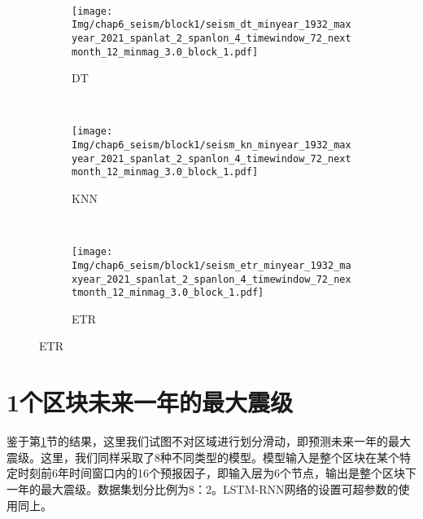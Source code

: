 \begin{figure}[!htbp]
\begin{subfigure}[b]{0.45\textwidth}
    \vspace{-1cm}
    \label{fig:seism_gbr_minyear_1932_maxyear_2021_spanlat_2_spanlon_4_timewindow_72_nextmonth_12_minmag_3.0_block_1}
  \end{subfigure}
  ~
  \begin{subfigure}[b]{0.45\textwidth}
    \caption{DT}
    \vspace{-0.2cm}
    \texttt{[image: Img/chap6\_seism/block1/seism\_dt\_minyear\_1932\_maxyear\_2021\_spanlat\_2\_spanlon\_4\_timewindow\_72\_nextmonth\_12\_minmag\_3.0\_block\_1.pdf]}
    \vspace{-1cm}
    \label{fig:seism_dt_minyear_1932_maxyear_2021_spanlat_2_spanlon_4_timewindow_72_nextmonth_12_minmag_3.0_block_1}
  \end{subfigure}
  \\
  \begin{subfigure}[b]{0.45\textwidth}
    \caption{KNN}
    \vspace{-0.2cm}
    \texttt{[image: Img/chap6\_seism/block1/seism\_kn\_minyear\_1932\_maxyear\_2021\_spanlat\_2\_spanlon\_4\_timewindow\_72\_nextmonth\_12\_minmag\_3.0\_block\_1.pdf]}
    \vspace{-1cm}
    \label{fig:seism_knn_minyear_1932_maxyear_2021_spanlat_2_spanlon_4_timewindow_72_nextmonth_12_minmag_3.0_block_1}
  \end{subfigure}
  ~
  \begin{subfigure}[b]{0.45\textwidth}
    \caption{ETR}
    \vspace{-0.2cm}
    \texttt{[image: Img/chap6\_seism/block1/seism\_etr\_minyear\_1932\_maxyear\_2021\_spanlat\_2\_spanlon\_4\_timewindow\_72\_nextmonth\_12\_minmag\_3.0\_block\_1.pdf]}
    \vspace{-1cm}
    \label{fig:seism_etr_minyear_1932_maxyear_2021_spanlat_2_spanlon_4_timewindow_72_nextmonth_12_minmag_3.0_block_1}
  \end{subfigure}
  \label{fig:seism_minyear_1932_maxyear_2021_spanlat_2_spanlon_4_timewindow_72_nextmonth_12_minmag_3.0_block_1}
\end{figure}


\section{1个区块未来一年的最大震级}\label{sec:seism_result_1}

鉴于第\ref{sec:seism_result_1}节的结果，这里我们试图不对区域进行划分滑动，即预测未来一年的最大震级。这里，我们同样采取了8种不同类型的模型。模型输入是整个区块在某个特定时刻前6年时间窗口内的16个预报因子，即输入层为$6$个节点，输出是整个区块下一年的最大震级。数据集划分比例为8：2。LSTM-RNN网络的设置可超参数的使用同上。

